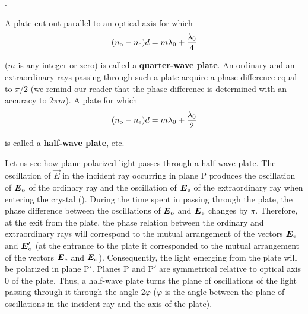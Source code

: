 .

A plate cut out parallel to an optical axis for which
\begin{equation*}
	(n_{\text{o}} - n_{\text{e}}) d = m\lambda_0 + \frac{\lambda_0}{4}
\end{equation*}

\noindent
($m$ is any integer or zero) is called a \textbf{quarter-wave plate}.
An ordinary and an extraordinary rays passing through such a plate acquire a phase difference equal to $\pi/2$ (we remind our reader that the phase difference is determined with an accuracy to $2\pi m$).
A plate for which
\begin{equation*}
	(n_{\text{o}} - n_{\text{e}}) d = m\lambda_0 + \frac{\lambda_0}{2}
\end{equation*}

\noindent
is called a \textbf{half-wave plate}, etc.

Let us see how plane-polarized light passes through a half-wave plate.
The oscillation of $\vec{E}$ in the incident ray occurring in plane P produces the oscillation of $\boldsymbol{E}_{\text{o}}$ of the ordinary ray and the oscillation of $\boldsymbol{E}_{\text{e}}$ of the extraordinary ray when entering the crystal ().
During the time spent in passing through the plate, the phase difference between the oscillations of $\boldsymbol{E}_{\text{o}}$ and $\boldsymbol{E}_{\text{e}}$ changes by $\pi$.
Therefore, at the exit from the plate, the phase relation between the ordinary and extraordinary rays will correspond to the mutual arrangement
of the vectors $\boldsymbol{E}_{\text{e}}$ and $\boldsymbol{E}_{\text{o}}'$ (at the entrance to the plate it corresponded to the mutual arrangement of the vectors $\boldsymbol{E}_{\text{e}}$ and $\boldsymbol{E}_{\text{o}}$).
Consequently, the light emerging from the plate will be polarized in plane P$'$.
Planes P and P$'$ are symmetrical relative to optical axis $0$ of the plate.
Thus, a half-wave plate turns the plane of oscillations of the light passing through it through the angle $2\varphi$ ($\varphi$ is the angle between the plane of oscillations in the incident ray and the axis of the plate).

